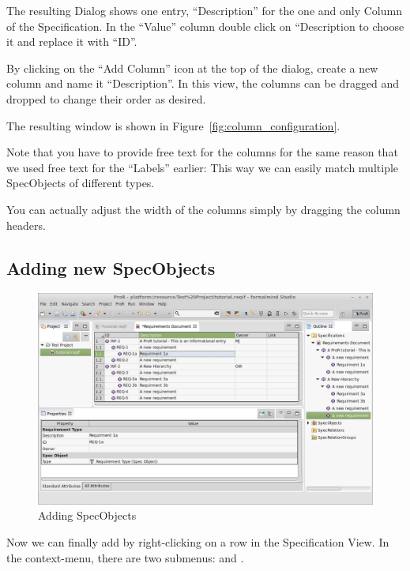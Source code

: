 The resulting Dialog shows one entry, ``Description'' for the one and only Column of the Specification.  In the ``Value'' column double click on ``Description to choose it and replace it with ``ID''.

By clicking on the ``Add Column'' icon at the top of the dialog, create a new column and name it ``Description''.  In this view, the columns can be dragged and dropped to change their order as desired.

The resulting window is shown in Figure~\ref{fig:column_configuration}.

\begin{info}
Note that you have to provide free text for the columns for the same reason that we used free text for the ``Labels'' earlier: This way we can easily match multiple SpecObjects of different types.
\end{info}

You can actually adjust the width of the columns simply by dragging the column headers.

\subsection{Adding new SpecObjects}

\begin{figure}
\centering
\includegraphics[width=\linewidth]{../rmf-images/hierarchy_example.png}      
\caption{Adding SpecObjects}      
\label{fig:requirements_hierarchy}
\end{figure}

Now we can finally add  by right-clicking on a row in the Specification View.  In the context-menu, there are two submenus:  and .


